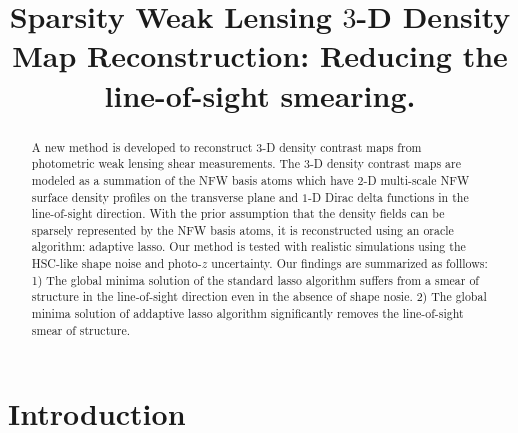 \documentclass[twocolumn]{aastex62}
\begin{document}
\title{Sparsity Weak Lensing $3$-D Density Map Reconstruction: 
Reducing the line-of-sight smearing.}

\begin{abstract}
A new method is developed to reconstruct $3$-D density contrast maps from photometric weak lensing shear measurements.
The $3$-D density contrast maps are modeled as a summation of the NFW basis atoms which have $2$-D multi-scale NFW surface 
density profiles on the transverse plane and $1$-D Dirac delta functions in the line-of-sight direction. With the prior 
assumption that the density fields can be sparsely represented by the NFW basis atoms, it is reconstructed using an 
oracle algorithm: adaptive lasso. Our method is tested with realistic simulations using the HSC-like shape noise and 
photo-$z$ uncertainty.
Our findings are summarized as folllows: 1) The global minima solution of the standard lasso algorithm suffers from a
smear of structure in the line-of-sight direction even in the absence of shape nosie.
2) The global minima solution of addaptive lasso algorithm significantly removes the line-of-sight smear of structure.
\end{abstract}

\section{Introduction}
\end{document}
